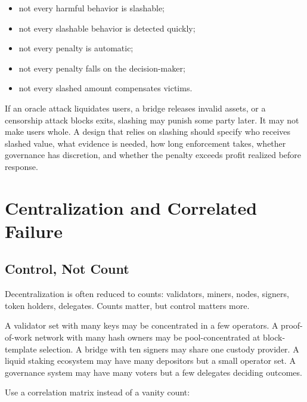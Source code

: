 \begin{itemize}
\item not every harmful behavior is slashable;
\item not every slashable behavior is detected quickly;
\item not every penalty is automatic;
\item not every penalty falls on the decision-maker;
\item not every slashed amount compensates victims.
\end{itemize}

If an oracle attack liquidates users, a bridge releases invalid assets, or a censorship attack blocks exits, slashing may punish some party later. It may not make users whole. A design that relies on slashing should specify who receives slashed value, what evidence is needed, how long enforcement takes, whether governance has discretion, and whether the penalty exceeds profit realized before response.

\section{Centralization and Correlated Failure}

\subsection{Control, Not Count}

Decentralization is often reduced to counts: validators, miners, nodes, signers, token holders, delegates. Counts matter, but control matters more.

A validator set with many keys may be concentrated in a few operators. A proof-of-work network with many hash owners may be pool-concentrated at block-template selection. A bridge with ten signers may share one custody provider. A liquid staking ecosystem may have many depositors but a small operator set. A governance system may have many voters but a few delegates deciding outcomes.

Use a correlation matrix instead of a vanity count:

